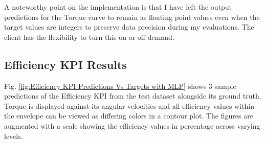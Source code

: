 \documentclass{report} %
\begin{document}
A noteworthy point on the implementation is that I have left the output predictions for the Torque curve to remain as floating point values even when the target values 
are integers to preserve data precision during my evaluations. The client has the flexibility to turn this on or off demand. 

\subsection{Efficiency KPI Results}\label{subsec:Efficiency KPI Results with MLP Efficiency KPI Regularization}
Fig. \ref{fig:Efficiency KPI Predictions Vs Targets with MLP} shows 3 sample predictions of the Efficiency \ac{KPI} from the test dataset alongside its ground truth.
Torque is displayed against its angular velocities and all efficiency values within the envelope can be viewed as differing colors in a contour plot. 
The figures are augmented with a scale showing the efficiency values in percentage across varying levels. 
\end{document}
